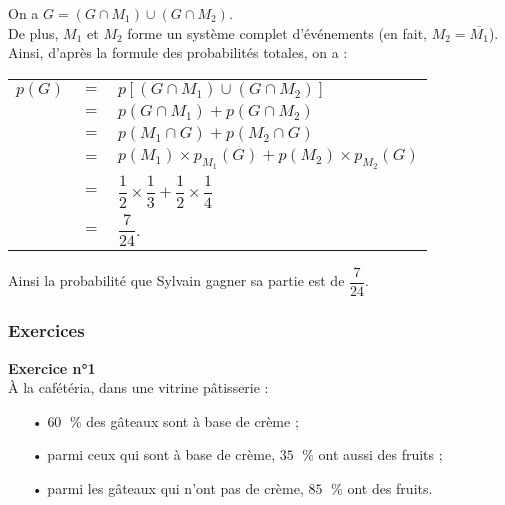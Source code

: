 On a $G = \left(G \cap M_1\right) \cup \left(G \cap M_2\right)$. \\

De plus, $M_1$ et $M_2$ forme un système complet d'événements (en fait, $M_2 = \overline{M_1}$). \\

Ainsi, d'après la formule des probabilités totales, on a : \\

\begin{tabular}{lll}
$p\left(G\right)$ & $=$ & $p\left[ \left(G \cap M_1\right) \cup \left(G \cap M_2\right) \right]$ \vspace*{.3cm} \\
& $=$ & $p\left(G\cap M_1\right) + p\left(G \cap M_2\right)$ \vspace*{.3cm} \\
& $=$ & $p\left(M_1 \cap G\right) + p\left(M_2 \cap G\right)$ \vspace*{.3cm} \\
& $=$ & $p\left(M_1\right) \times p_{M_1}\left(G\right) + p\left(M_2\right) \times p_{M_2}\left(G\right)$ \vspace*{.3cm} \\
& $=$ & $\dfrac{1}{2} \times \dfrac{1}{3} + \dfrac{1}{2} \times \dfrac{1}{4}$ \vspace*{.3cm} \\
& $=$ & $\dfrac{7}{24}$.
\end{tabular}

\vspace*{.3cm}

Ainsi la probabilité que Sylvain gagner sa partie est de $\dfrac{7}{24}$. 

\newpage

\subsubsection{Exercices}

\textbf{Exercice n°1} \\

À la cafétéria, dans une vitrine pâtisserie : \\

\begin{itemize}
\item[•] $60 \;$ \% des gâteaux sont à base de crème ;
\item[•] parmi ceux qui sont à base de crème, $35 \;$ \% ont aussi des fruits ; 
\item[•] parmi les gâteaux qui n'ont pas de crème, $85 \;$ \% ont des fruits. 
\end{itemize}

